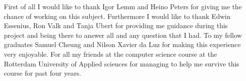 
First of all I would like to thank Igor Lemm and Heino Peters for giving me the chance of working on this subject. Furthermore I would like to thank Edwin Essenius, Ron Valk and Tanja Ubert for providing me guidance during this project and being there to answer all and any question that I had. To my fellow graduates Samuel Cheung and Nilson Xavier da Luz for making this experience very enjoyable. For all my friends at the computer science course at the Rotterdam University of Applied sciences for managing to help me survive this course for past four years.


